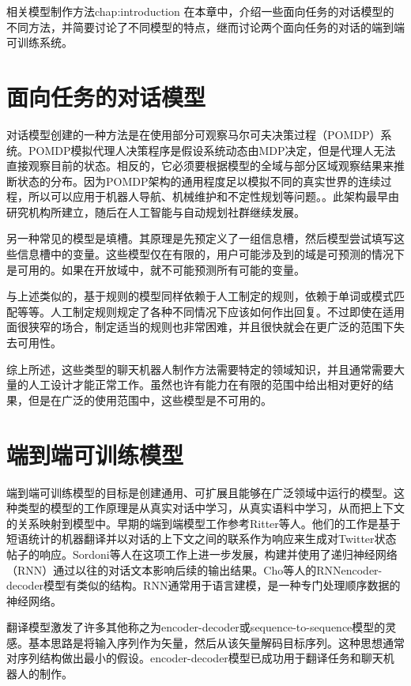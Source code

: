 \begin{cuzchapter}{相关模型制作方法}{chap:introduction}
在本章中，介绍一些面向任务的对话模型的不同方法，并简要讨论了不同模型的特点，继而讨论两个面向任务的对话的端到端可训练系统。
\section{面向任务的对话模型}\label{sec:background}
对话模型创建的一种方法是在使用部分可观察马尔可夫决策过程（POMDP）系统\cite{WILLIAMS2007393}。POMDP模拟代理人决策程序是假设系统动态由MDP决定，但是代理人无法直接观察目前的状态。相反的，它必须要根据模型的全域与部分区域观察结果来推断状态的分布。因为POMDP架构的通用程度足以模拟不同的真实世界的连续过程，所以可以应用于机器人导航、机械维护和不定性规划等问题。\cite{仵博2007部分可观察马尔可夫决策过程研究进展}。此架构最早由研究机构所建立，随后在人工智能与自动规划社群继续发展。

另一种常见的模型是填槽\cite{D4.1}。其原理是先预定义了一组信息槽，然后模型尝试填写这些信息槽中的变量。这些模型仅在有限的，用户可能涉及到的域是可预测的情况下是可用的。如果在开放域中，就不可能预测所有可能的变量。

与上述类似的，基于规则的模型同样依赖于人工制定的规则，依赖于单词或模式匹配等等。人工制定规则规定了各种不同情况下应该如何作出回复。不过即使在适用面很狭窄的场合，制定适当的规则也非常困难，并且很快就会在更广泛的范围下失去可用性。

综上所述，这些类型的聊天机器人制作方法需要特定的领域知识，并且通常需要大量的人工设计才能正常工作。虽然也许有能力在有限的范围中给出相对更好的结果，但是在广泛的使用范围中，这些模型是不可用的。
\section{端到端可训练模型}\label{sec:background}
端到端可训练模型的目标是创建通用、可扩展且能够在广泛领域中运行的模型。这种类型的模型的工作原理是从真实对话中学习，从真实语料中学习，从而把上下文的关系映射到模型中。早期的端到端模型工作参考Ritter等人\cite{Ritter2011Data}。他们的工作是基于短语统计的机器翻译并以对话的上下文之间的联系作为响应来生成对Twitter状态帖子的响应。Sordoni等人\cite{DBLP:journals/corr/SordoniGABJMNGD15}在这项工作上进一步发展，构建并使用了递归神经网络（RNN）通过以往的对话文本影响后续的输出结果。Cho等人的RNNencoder-decoder模型\cite{DBLP:journals/corr/ChoMGBSB14}有类似的结构。RNN通常用于语言建模，是一种专门处理顺序数据的神经网络\cite{朱晶晶2018基于}。

翻译模型激发了许多其他称之为encoder-decoder\cite{DBLP:journals/corr/ShangLL15}或sequence-to-sequence\cite{DBLP:journals/corr/VinyalsL15}模型的灵感。基本思路是将输入序列作为矢量，然后从该矢量解码目标序列。这种思想通常对序列结构做出最小的假设。encoder-decoder模型已成功用于翻译任务和聊天机器人的制作。


\end{cuzchapter}
